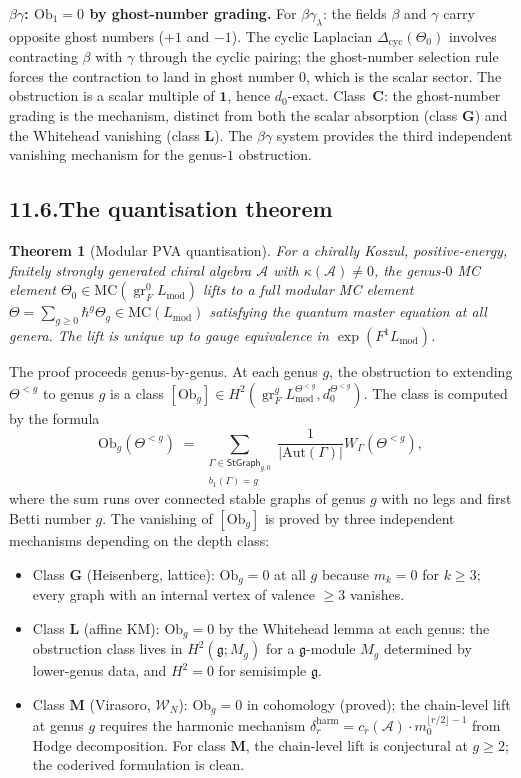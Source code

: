 \documentclass[11pt,reqno]{amsart}
\newtheorem{theorem}{Theorem}[section]
\theoremstyle{definition}
\theoremstyle{remark}
\providecommand{\cA}{\mathcal{A}}
\providecommand{\cW}{\mathcal{W}}
\providecommand{\MC}{\mathrm{MC}}
\providecommand{\Aut}{\mathrm{Aut}}
\providecommand{\fg}{\mathfrak{g}}
\renewcommand{\mod}{\mathrm{mod}}
\providecommand{\Ob}{\mathrm{Ob}}
\DeclareMathOperator{\gr}{gr}
\numberwithin{equation}{section}
\begin{document}
\medskip
\noindent\textbf{$\beta\gamma$: $\Ob_1 = 0$ by ghost-number
grading.}\enspace
For $\beta\gamma_\lambda$: the fields $\beta$ and $\gamma$ carry
opposite ghost numbers ($+1$ and $-1$). The cyclic Laplacian
$\Delta_{\mathrm{cyc}}(\Theta_0)$ involves contracting $\beta$
with $\gamma$ through the cyclic pairing; the ghost-number
selection rule forces the contraction to land in ghost number
$0$, which is the scalar sector. The obstruction is a scalar
multiple of $\mathbf{1}$, hence $d_0$-exact.
Class~$\mathbf{C}$: the ghost-number grading is the mechanism,
distinct from both the scalar absorption (class $\mathbf{G}$)
and the Whitehead vanishing (class $\mathbf{L}$). The
$\beta\gamma$ system provides the third independent vanishing
mechanism for the genus-$1$ obstruction.

\subsection*{11.6.\enspace The quantisation theorem}

\begin{theorem}[Modular PVA quantisation]
For a chirally Koszul, positive-energy, finitely strongly
generated chiral algebra $\cA$ with $\kappa(\cA) \neq 0$, the
genus-$0$ MC element $\Theta_0 \in \MC(\gr^0_F L_{\mod})$ lifts
to a full modular MC element
$\Theta = \sum_{g \ge 0} \hbar^g \Theta_g
\in \MC(L_{\mod})$
satisfying the quantum master equation at all genera. The lift
is unique up to gauge equivalence in
$\exp(F^1 L_{\mod})$.
\end{theorem}

\noindent
The proof proceeds genus-by-genus. At each genus $g$, the
obstruction to extending $\Theta^{< g}$ to genus $g$ is a
class $[\Ob_g] \in H^2(\gr^g_F L_{\mod}^{\Theta^{<g}},
d_0^{\Theta^{<g}})$. The class is computed by the formula
\[
\Ob_g(\Theta^{<g})
\;=\;
\sum_{\substack{\Gamma \in \mathsf{StGraph}_{g,0} \\
b_1(\Gamma) = g}}
\frac{1}{|\Aut(\Gamma)|}
W_\Gamma(\Theta^{<g}),
\]
where the sum runs over connected stable graphs of genus $g$
with no legs and first Betti number $g$. The vanishing of
$[\Ob_g]$ is proved by three independent mechanisms depending
on the depth class:
\begin{itemize}[nosep]
\item Class $\mathbf{G}$ (Heisenberg, lattice):
$\Ob_g = 0$ at all $g$ because $m_k = 0$ for $k \ge 3$;
every graph with an internal vertex of valence $\ge 3$
vanishes.
\item Class $\mathbf{L}$ (affine KM):
$\Ob_g = 0$ by the Whitehead lemma at each genus: the
obstruction class lives in $H^2(\fg; M_g)$ for a
$\fg$-module $M_g$ determined by lower-genus data, and
$H^2 = 0$ for semisimple $\fg$.
\item Class $\mathbf{M}$ (Virasoro, $\cW_N$):
$\Ob_g = 0$ in cohomology (proved); the chain-level lift
at genus $g$ requires the harmonic mechanism
$\delta_r^{\mathrm{harm}} = c_r(\cA) \cdot m_0^{\lfloor r/2 \rfloor - 1}$
from Hodge decomposition. For class $\mathbf{M}$,
the chain-level lift is conjectural at $g \ge 2$; the
coderived formulation is clean.
\end{itemize}
\end{document}
